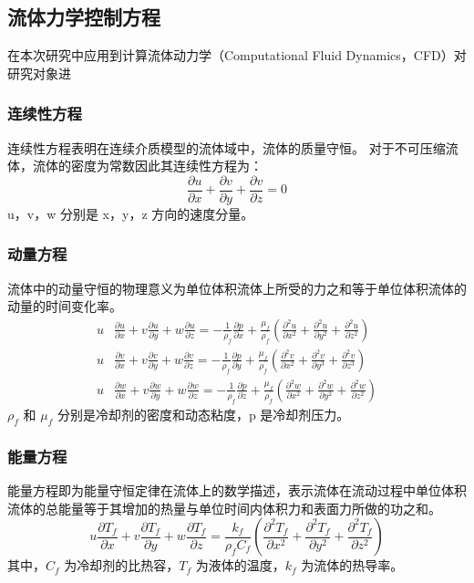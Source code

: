 \subsection{流体力学控制方程}
在本次研究中应用到计算流体动力学（Computational Fluid Dynamics，CFD）对研究对象进

\subsubsection{连续性方程}
连续性方程表明在连续介质模型的流体域中，流体的质量守恒。
对于不可压缩流体，流体的密度为常数因此其连续性方程为：
\begin{equation}
    \frac{\partial u}{\partial x}+\frac{\partial v}{\partial y}+\frac{\partial v}{\partial z}=0
\end{equation}
u，v，w 分别是 x，y，z 方向的速度分量。

\subsubsection{动量方程}
流体中的动量守恒的物理意义为单位体积流体上所受的力之和等于单位体积流体的动量的时间变化率。
\begin{align}%
    u & \frac{\partial u}{\partial x}+v \frac{\partial u}{\partial y}+w \frac{\partial u}{\partial z}=-\frac{1}{\rho_{f}} \frac{\partial p}{\partial x}+\frac{\mu_{f}}{\rho_{f}}\left(\frac{\partial^{2} u}{\partial x^{2}}+\frac{\partial^{2} u}{\partial y^{2}}+\frac{\partial^{2} u}{\partial z^{2}}\right) \\
    u & \frac{\partial v}{\partial x}+v \frac{\partial v}{\partial y}+w \frac{\partial v}{\partial z}=-\frac{1}{\rho_{f}} \frac{\partial p}{\partial y}+\frac{\mu_{f}}{\rho_{f}}\left(\frac{\partial^{2} v}{\partial x^{2}}+\frac{\partial^{2} v}{\partial y^{3}}+\frac{\partial^{2} v}{\partial z^{3}}\right) \\
    u & \frac{\partial w}{\partial x}+v \frac{\partial w}{\partial y}+w \frac{\partial w}{\partial z}=-\frac{1}{\rho_{f}} \frac{\partial p}{\partial z}+\frac{\mu_{f}}{\rho_{f}}\left(\frac{\partial^{2} w}{\partial x^{2}}+\frac{\partial^{2} w}{\partial y^{2}}+\frac{\partial^{2} w}{\partial z^{2}}\right)
\end{align}
$\rho_{f}$ 和 $\mu_{f}$ 分别是冷却剂的密度和动态粘度，p 是冷却剂压力。

\subsubsection{能量方程}
能量方程即为能量守恒定律在流体上的数学描述，表示流体在流动过程中单位体积流体的总能量等于其增加的热量与单位时间内体积力和表面力所做的功之和。
\begin{equation}
    u \frac{\partial T_{f}}{\partial x}+v \frac{\partial T_{f}}{\partial y}+w \frac{\partial T_{f}}{\partial z}=\frac{k_{f}}{\rho_{f} C_{ f}}\left(\frac{\partial^{2} T_{f}}{\partial x^{2}}+\frac{\partial^{2} T_{f}}{\partial y^{2}}+\frac{\partial^{2} T_{f}}{\partial z^{2}}\right)
\end{equation}
其中，$C_{f}$ 为冷却剂的比热容，$T_{f}$ 为液体的温度，$k_{f}$ 为流体的热导率。

